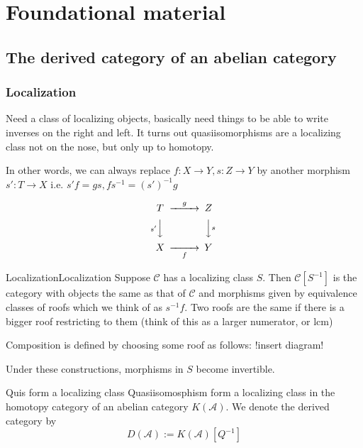 \section{Foundational material}


\subsection{The derived category of an abelian category}
\subsubsection{Localization}

Need a class of localizing objects, basically need things to be able to write inverses on the right and left. It turns out quasiisomorphisms are a localizing class not on the nose, but only up to homotopy.

In other words, we can always replace $f:X\rightarrow Y, s:Z\rightarrow Y$ by another morphism $s':T\rightarrow X$ i.e.  $s'f=gs,fs^{-1}=(s')^{-1}g$

$$\begin{CD} T @>g>> Z \\ @Vs'VV @VVsV \\ X @> >f > Y\end{CD}$$

\begin{definition}{Localization}{Localization}
    Suppose $\mathcal{C}$ has a localizing class $S$. Then $\mathcal{C}[S^{-1}]$ is the category with objects the same as that of $\mathcal{C}$ and morphisms given by equivalence classes of roofs which we think of as $s^{-1}f$. Two roofs are the same if there is a bigger roof restricting to them (think of this as a larger numerator, or lcm)
\end{definition}

Composition is defined by choosing some roof as follows: !insert diagram!
 
Under these constructions, morphisms in $S$ become invertible. 

\begin{theorem}{}{Quis form a localizing class}
    Quasiisomosphism form a localizing class in the homotopy category of an abelian category $K(\mathcal{A})$. We denote the derived category by$$D(\mathcal{A}):=K(\mathcal{A})[Q^{-1}]$$
\end{theorem}

